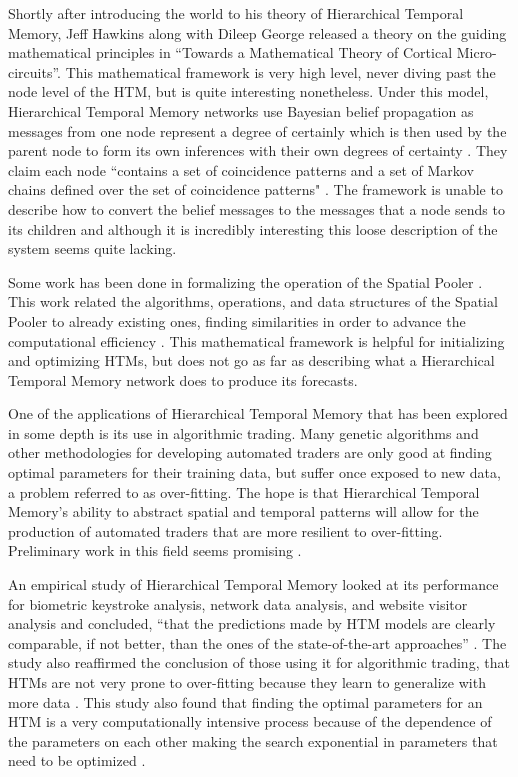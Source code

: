 \documentclass[oneside,12pt,openany]{book}
\begin{document}
	Shortly after introducing the world to his theory of Hierarchical Temporal Memory, Jeff Hawkins along with Dileep George released a theory on the guiding mathematical principles in ``Towards a Mathematical Theory of Cortical Micro-circuits''. This mathematical framework is very high level, never diving past the node level of the HTM, but is quite interesting nonetheless. Under this model, Hierarchical Temporal Memory networks use Bayesian belief propagation as messages from one node represent a degree of certainly which is then used by the parent node to form its own inferences with their own degrees of certainty \cite{Towards}. They claim each node ``contains a set of coincidence patterns and a set of Markov chains defined over the set of coincidence patterns" \cite{Towards}. The framework is unable to describe how to convert the belief messages to the messages that a node sends to its children and although it is incredibly interesting this loose description of the system seems quite lacking.
	
	Some work has been done in formalizing the operation of the Spatial Pooler \cite{Framework}. This work related the algorithms, operations, and data structures of the Spatial Pooler to already existing ones, finding similarities in order to advance the computational efficiency \cite{Framework}. This mathematical framework is helpful for initializing and optimizing HTMs, but does not go as far as describing what a Hierarchical Temporal Memory network does to produce its forecasts.
	
	One of the applications of Hierarchical Temporal Memory that has been explored in some depth is its use in algorithmic trading. Many genetic algorithms and other methodologies for developing automated traders are only good at finding optimal parameters for their training data, but suffer once exposed to new data, a problem referred to as over-fitting. The hope is that Hierarchical Temporal Memory's ability to abstract spatial and temporal patterns will allow for the production of automated traders that are more resilient to over-fitting. Preliminary work in this field seems promising \cite{Evaluation}.
	
	An empirical study of Hierarchical Temporal Memory looked at its performance for biometric keystroke analysis, network data analysis, and website visitor analysis and concluded, ``that the predictions made by HTM models are clearly comparable, if not better, than the ones of the state-of-the-art approaches'' \cite{Galetzka}. The study also reaffirmed the conclusion of those using it for algorithmic trading, that HTMs are not very prone to over-fitting because they learn to generalize with more data \cite{Evaluation} \cite{Galetzka}. This study also found that finding the optimal parameters for an HTM is a very computationally intensive process because of the dependence of the parameters on each other making the search exponential in parameters that need to be optimized \cite{Galetzka}.
	 
\end{document}
